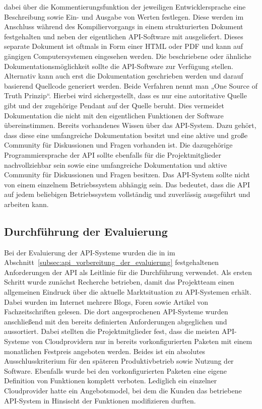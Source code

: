 \begin{outline}
  dabei über die Kommentierungsfunktion der jeweiligen Entwicklersprache eine
  Beschreibung sowie Ein- und Ausgabe von Werten festlegen. Diese werden im
  Anschluss während des Kompiliervorgangs in einem strukturierten Dokument
  festgehalten und neben der eigentlichen API-Software mit ausgeliefert. Dieses
  separate Dokument ist oftmals in Form einer HTML oder PDF und kann auf
  gängigen Computersystemen eingesehen werden. Die beschriebene oder ähnliche
  Dokumentationsmöglichkeit sollte die API-Software zur Verfügung stellen.
  Alternativ kann auch erst die Dokumentation geschrieben werden und darauf
  basierend Quellcode generiert werden. Beide Verfahren nennt man „One Source
  of Truth Prinzip“. Hierbei wird sichergestellt, dass es nur eine autoritative
  Quelle gibt und der zugehörige Pendant auf der Quelle beruht. Dies vermeidet
  Dokumentation die nicht mit den eigentlichen Funktionen der Software
  übereinstimmen.
  \1 Bereits vorhandenes Wissen über das API-System. Dazu gehört, dass diese
  eine umfangreiche Dokumentation besitzt und eine aktive und große Community
  für Diskussionen und Fragen vorhanden ist. Die dazugehörige
  Programmiersprache der API sollte ebenfalls für die Projektmitglieder
  nachvollziehbar sein sowie eine umfangreiche Dokumentation und aktive
  Community für Diskussionen und Fragen besitzen.
  \1 Das API-System sollte nicht von einem einzelnem Betriebssystem abhängig
  sein. Das bedeutet, dass die API auf jedem beliebigen Betriebssystem
  vollständig und zuverlässig ausgeführt und arbeiten kann.
\end{outline}
\nl%

\subsection{Durchführung der Evaluierung}
\label{subsec:api_durchfuehrung_der_evaluierung}
Bei der Evaluierung der API-Systeme wurden die in
im Abschnitt~\ref{subsec:api_vorbereitung_der_evaluierung} festgehaltenen
Anforderungen der API als Leitlinie für die Durchführung verwendet. Als ersten
Schritt wurde zunächst Recherche betrieben, damit das Projektteam einen
allgemeinen Eindruck über die aktuelle Marktsituation zu API-Systemen erhält.
Dabei wurden im Internet mehrere Blogs, Foren sowie Artikel von
Fachzeitschriften gelesen. Die dort angesprochenen API-Systeme wurden
anschließend mit den bereits definierten Anforderungen abgeglichen und
aussortiert. Dabei stellten die Projektmitglieder fest, dass die meisten
API-Systeme von Cloudprovidern nur in bereits vorkonfigurierten Paketen mit
einem monatlichen Festpreis angeboten werden. Beides ist ein absolutes
Ausschlusskriterium für den späteren Produktivbetrieb sowie Nutzung der
Software. Ebenfalls wurde bei den vorkonfigurierten Paketen eine eigene
Definition von Funktionen komplett verboten. Lediglich ein einzelner
Cloudprovider hatte ein Angebotsmodel, bei dem die Kunden das betriebene
API-System in Hinsischt der Funktionen modifizieren durften.

